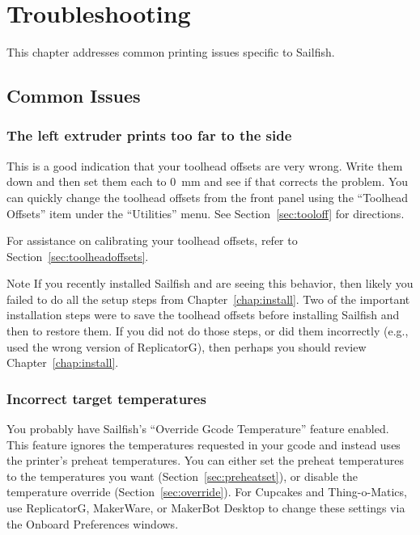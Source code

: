 
\chapter{Troubleshooting}

This chapter addresses common printing issues specific to Sailfish.


\section{Common Issues}

\subsection{The left extruder prints too far to the side}

This is a good indication that your toolhead offsets are very wrong.
Write them down and then set them each to 0~mm and see if that
corrects the problem.  You can quickly change the toolhead offsets
from the front panel using the ``Toolhead Offsets'' item under the
``Utilities'' menu.  See Section~\ref{sec:tooloff} for directions.

For assistance on calibrating your toolhead offsets, refer to
Section~\ref{sec:toolheadoffsets}.

\begin{bclogo}[logo=\bcinfo, noborder=true, couleurBarre=yellow]{Note}
If you recently installed Sailfish and are seeing this behavior, then likely
you failed to do all the setup steps from Chapter~\ref{chap:install}.  Two
of the important installation steps were to save the toolhead offsets before
installing Sailfish and then to restore them.  If you did not do those
steps, or did them incorrectly (e.g., used the wrong version of ReplicatorG),
then perhaps you should review Chapter~\ref{chap:install}.
\end{bclogo}

\subsection{Incorrect target temperatures}

You probably have Sailfish's ``Override Gcode Temperature'' feature
enabled. This feature ignores the temperatures requested in your gcode and
instead uses the printer's preheat temperatures. You can either set the preheat
temperatures to the temperatures you want
(Section~\ref{sec:preheatset}), or disable the temperature override
(Section~\ref{sec:override}).  For Cupcakes and Thing-o-Matics, use
ReplicatorG, MakerWare, or MakerBot Desktop to change these settings
via the Onboard Preferences windows.

